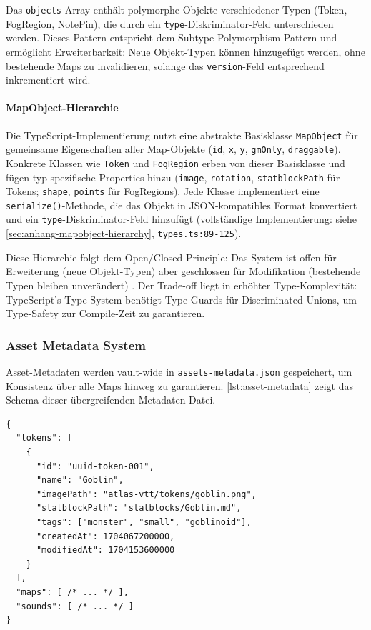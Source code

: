 Das \texttt{objects}-Array enthält polymorphe Objekte verschiedener Typen (Token, FogRegion, NotePin), die durch ein \texttt{type}-Diskriminator-Feld unterschieden werden. Dieses Pattern entspricht dem Subtype Polymorphism Pattern und ermöglicht Erweiterbarkeit: Neue Objekt-Typen können hinzugefügt werden, ohne bestehende Maps zu invalidieren, solange das \texttt{version}-Feld entsprechend inkrementiert wird.

\paragraph{MapObject-Hierarchie}

Die TypeScript-Implementierung nutzt eine abstrakte Basisklasse \texttt{MapObject} für gemeinsame Eigenschaften aller Map-Objekte (\texttt{id}, \texttt{x}, \texttt{y}, \texttt{gmOnly}, \texttt{draggable}). Konkrete Klassen wie \texttt{Token} und \texttt{FogRegion} erben von dieser Basisklasse und fügen typ-spezifische Properties hinzu (\texttt{image}, \texttt{rotation}, \texttt{statblockPath} für Tokens; \texttt{shape}, \texttt{points} für FogRegions). Jede Klasse implementiert eine \texttt{serialize()}-Methode, die das Objekt in \ac{JSON}-kompatibles Format konvertiert und ein \texttt{type}-Diskriminator-Feld hinzufügt (vollständige Implementierung: siehe \autoref{sec:anhang-mapobject-hierarchy}, \texttt{types.ts:89-125}).

Diese Hierarchie folgt dem Open/Closed Principle: Das System ist offen für Erweiterung (neue Objekt-Typen) aber geschlossen für Modifikation (bestehende Typen bleiben unverändert) \autocite{StackifyOCP}. Der Trade-off liegt in erhöhter Type-Komplexität: TypeScript's Type System benötigt Type Guards für Discriminated Unions, um Type-Safety zur Compile-Zeit zu garantieren.

\subsubsection{Asset Metadata System}

Asset-Metadaten werden vault-wide in \texttt{assets-metadata.json} gespeichert, um Konsistenz über alle Maps hinweg zu garantieren. \autoref{lst:asset-metadata} zeigt das Schema dieser übergreifenden Metadaten-Datei.

\begin{lstlisting}[float,language={},caption={Asset Metadata Schema},label=lst:asset-metadata]
{
  "tokens": [
    {
      "id": "uuid-token-001",
      "name": "Goblin",
      "imagePath": "atlas-vtt/tokens/goblin.png",
      "statblockPath": "statblocks/Goblin.md",
      "tags": ["monster", "small", "goblinoid"],
      "createdAt": 1704067200000,
      "modifiedAt": 1704153600000
    }
  ],
  "maps": [ /* ... */ ],
  "sounds": [ /* ... */ ]
}
\end{lstlisting}

